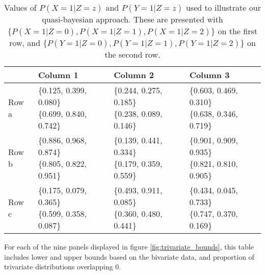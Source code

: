 \documentclass[
]{article}
\theoremstyle{plain}
\begin{document}
{\begin{table}[H]
  \center
  \caption{Values of $P(X = 1 | Z = z)$ and $P(Y = 1 | Z = z)$ used to illustrate our quasi-bayesian approach. These are presented with $\{P(X = 1 | Z = 0), P(X = 1 | Z = 1), P(X = 1 | Z = 2)\}$ on the first row, and $\{P(Y = 1 | Z = 0), P(Y = 1 | Z = 1), P(Y = 1 | Z = 2)\}$ on the second row.}
  \label{tab:subset_plot_summaries_b}
  
\begin{tabular}{llll}
\toprule
  & Column 1 & Column 2 & Column 3\\
\midrule
Row a & \makecell[l]{\{0.125, 0.399, 0.080\}\\\{0.699, 0.840, 0.742\}} & \makecell[c]{\{0.244, 0.275, 0.185\}\\\{0.238, 0.089, 0.146\}} & \makecell[r]{\{0.603, 0.469, 0.310\}\\\{0.638, 0.346, 0.719\}}\\
Row b & \makecell[l]{\{0.886, 0.968, 0.874\}\\\{0.805, 0.822, 0.951\}} & \makecell[c]{\{0.139, 0.441, 0.334\}\\\{0.179, 0.359, 0.559\}} & \makecell[r]{\{0.901, 0.909, 0.935\}\\\{0.821, 0.810, 0.905\}}\\
Row c & \makecell[l]{\{0.175, 0.079, 0.365\}\\\{0.599, 0.358, 0.087\}} & \makecell[c]{\{0.493, 0.911, 0.085\}\\\{0.360, 0.480, 0.441\}} & \makecell[r]{\{0.434, 0.045, 0.733\}\\\{0.747, 0.370, 0.169\}}\\
\bottomrule
\end{tabular}


\end{table}

\begin{table}[H]
  \center
  \caption{For each of the nine panels displayed in figure \ref{fig:trivariate_bounds}, this table includes lower and upper bounds based on the bivariate data, and proportion of trivariate distributions overlapping 0.}
  \label{tab:subset_plot_summaries_a}
  

\end{table}}
\end{document}
